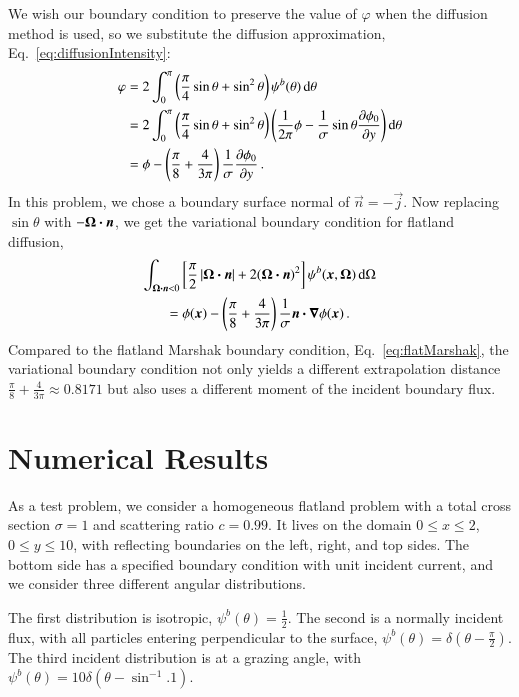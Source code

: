 \documentclass{anstrans}
\begin{document}
We wish our boundary condition to preserve the value of $\varphi$ when the
diffusion method is used, so we substitute the diffusion approximation,
Eq.~\eqref{eq:diffusionIntensity}:
\begin{align*}
 \varphi &= 2\int_{0}^{\pi} \left( \frac{\pi}{4} \sin\theta + \sin^2\theta \right)
 \psi^b(\theta) \mathop{}\!\mathrm{d}\theta
 \\
 &= 
  2\int_{0}^{\pi} \left( \frac{\pi}{4} \sin\theta + \sin^2\theta \right)
 \left( \frac{1}{2\pi} \phi -
  \frac{1}{\sigma} \sin\theta \frac{\partial \phi_0}{\partial y}\right)\mathop{}\!\mathrm{d}\theta
\\
 &= 
  \phi
- \left( \frac{\pi}{8} + \frac{4}{3\pi} \right) \frac{1}{\sigma} \frac{\partial \phi_0}{\partial y}
\,.
\end{align*}
In this problem, we chose a boundary surface normal of $\vec{n}=-\vec{j}$. Now
replacing $\sin \theta$ with $-\bm{\Omega}\bm{\cdot}\bm{n}$, we get the 
variational boundary condition for flatland diffusion,
\begin{multline} \label{eq:flatVarBc}
\int_{\bm{\Omega}\bm{\cdot}\bm{n} < 0} \left[ \frac{\pi}{2}
\left| \bm{\Omega}\bm{\cdot}\bm{n} \right| + 2 (\bm{\Omega}\bm{\cdot}\bm{n})^2 \right]
\psi^b(\bm{x}, \bm{\Omega}) \mathop{}\!\mathrm{d}\Omega
\\
= 
  \phi(\bm{x})
  - \left( \frac{\pi}{8} + \frac{4}{3\pi} \right) \frac{1}{\sigma}
  \bm{n}\bm{\cdot}\bm{\nabla} \phi(\bm{x})\,.
\end{multline}
Compared to the flatland Marshak boundary condition,
Eq.~\eqref{eq:flatMarshak}, the variational boundary condition not only yields a
different extrapolation distance $\frac{\pi}{8} + \frac{4}{3\pi} \approx
0.8171$ but also uses a different moment of the incident boundary flux.

\section{Numerical Results}
As a test problem, we consider a homogeneous flatland problem with a
total cross section $\sigma=1$ and scattering ratio $c=0.99$. It lives on the
domain $0 \le x \le 2$, $0 \le y \le 10$, with reflecting boundaries on the left,
right, and top sides. The bottom side has a specified boundary
condition with unit incident current, and we consider three different angular
distributions.

The first distribution is isotropic, $\psi^b(\theta) = \frac{1}{2}$. The second
is a normally incident flux, with all particles entering
perpendicular to the surface, $\psi^b(\theta) = \delta(\theta -
\frac{\pi}{2})$. The third incident distribution is at a grazing angle, with 
$\psi^b(\theta) = 10 \delta(\theta - \sin^{-1}.1)$.
\end{document}
